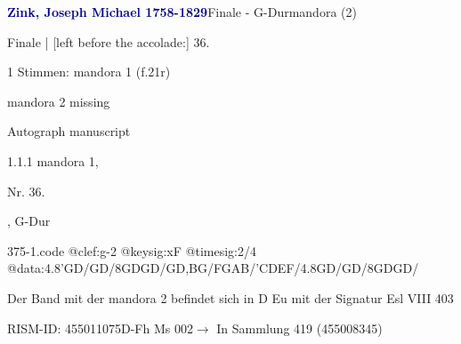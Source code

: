 \documentclass[twocolumn, 12pt]{book}
\begin{document}
\par \vspace{16pt} \textcolor{darkblue}{\textbf{Zink, Joseph Michael  1758-1829}}\hfillplus{\textbf{[375]}}\newline Finale - G-Dur\newline mandora (2)
\par \begin{itshape}[f.21r, at left:] Finale | [left before the accolade:] 36.\end{itshape} 
\par \textcolor{darkblue}{}  1 Stimmen: mandora 1  (f.21r)\newline \begin{small} mandora 2 missing\end{small} \newline Autograph manuscript
\par 1.1.1  mandora 1, \begin{itshape}Nr. 36.\end{itshape}, G-Dur  
\begin{filecontents*}{375-1.code}
@clef:g-2
@keysig:xF
@timesig:2/4
@data:4.8'GD/GD/8GDGD/GD,BG/FGAB/'CDEF/4.8GD/GD/8GDGD/
\end{filecontents*}
\newline %
\par Der Band mit der mandora 2 befindet sich in D Eu mit der Signatur Esl VIII 403
\par RISM-ID: 455011075\newline D-Fh  Ms 002\newline $\rightarrow$ In Sammlung 419 (455008345)
      
\end{document}
